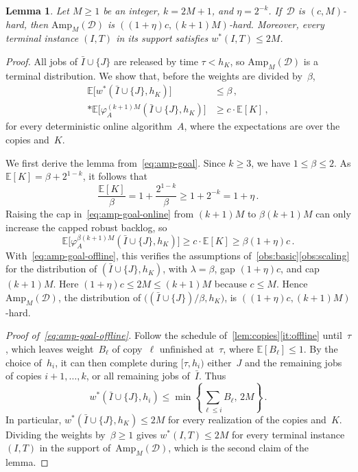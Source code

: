 \documentclass[11pt,letterpaper]{article}
\newtheorem{lemma}[theorem]{Lemma}
\theoremstyle{definition}
\theoremstyle{remark}
\newcommand{\E}{\mathbb{E}}
\newcommand{\cD}{\mathcal{D}}
\newcommand{\Amp}{\mathrm{Amp}}
\begin{document}
\begin{lemma}\label{lem:amplification}
Let $M\ge1$ be an integer, $k=2M+1$, and $\eta=2^{-k}$. If~$\cD$ is $(c,M)$-hard, then $\Amp_M(\cD)$ is $((1+\eta)c,(k+1)M)$-hard. Moreover, every terminal instance $(I,T)$ in its support satisfies $w^*(I,T)\le2M$.
\end{lemma}

\begin{proof}
All jobs of $\bar I\cup\{J\}$ are released by time $\tau<h_K$, so $\Amp_M(\cD)$ is a terminal distribution. We show that, before the weights are divided by~$\beta$,
\begin{subequations}\label{eq:amp-goal}
\begin{align}
  \E\bigl[w^*(\bar I\cup\{J\},h_K)\bigr]&\le\beta\,,\label{eq:amp-goal-offline}\\*
  \E\bigl[\varphi_A^{(k+1)M}(\bar I\cup\{J\},h_K)\bigr]&\ge c\cdot \E[K]\,,\label{eq:amp-goal-online}
\end{align}
\end{subequations}
for every deterministic online algorithm~$A$, where the expectations are over the copies and~$K$.

We first derive the lemma from~\eqref{eq:amp-goal}. Since $k\ge3$, we have $1\le\beta\le2$. As $\E[K]=\beta+2^{1-k}$, it follows that
\begin{equation*}
  \frac{\E[K]}{\beta}=1+\frac{2^{1-k}}{\beta}\ge1+2^{-k}=1+\eta\,.
\end{equation*}
Raising the cap in~\eqref{eq:amp-goal-online} from $(k+1)M$ to $\beta(k+1)M$ can only increase the capped robust backlog, so
\begin{equation*}
  \E\bigl[\varphi_A^{\beta(k+1)M}(\bar I\cup\{J\},h_K)\bigr]\ge c\cdot \E[K]\ge\beta(1+\eta)c\,.
\end{equation*}
With~\eqref{eq:amp-goal-offline}, this verifies the assumptions of~\cref{obs:basic}\ref{obs:scaling} for the distribution of $(\bar I\cup\{J\},h_K)$, with $\lambda=\beta$, gap $(1+\eta)c$, and cap $(k+1)M$. Here $(1+\eta)c\le2M\le(k+1)M$ because $c\le M$. Hence $\Amp_M(\cD)$, the distribution of $\bigl((\bar I\cup\{J\})/\beta,h_K\bigr)$, is $((1+\eta)c,(k+1)M)$-hard.

\emph{Proof of~\eqref{eq:amp-goal-offline}.} Follow the schedule of~\cref{lem:copies}\ref{it:offline} until~$\tau$, which leaves weight~$B_\ell$ of copy~$\ell$ unfinished at~$\tau$, where $\E[B_\ell]\le1$. By the choice of~$h_i$, it can then complete during $[\tau,h_i)$ either~$J$ and the remaining jobs of copies $i+1,\dots,k$, or all remaining jobs of~$\bar I$. Thus
\begin{equation*}
  w^*(\bar I\cup\{J\},h_i)\le\min\left\{\sum_{\ell\le i}B_\ell,\,2M\right\}\,.
\end{equation*}
In particular, $w^*(\bar I\cup\{J\},h_K)\le2M$ for every realization of the copies and~$K$. Dividing the weights by~$\beta\ge1$ gives $w^*(I,T)\le2M$ for every terminal instance $(I,T)$ in the support of~$\Amp_M(\cD)$, which is the second claim of the lemma.


\end{proof}
\end{document}
